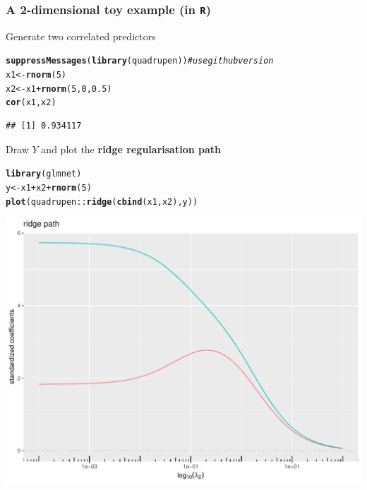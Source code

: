 \documentclass[10pt, c, xcolor=x11names]{beamer}\usepackage[]{graphicx}\usepackage[]{color}
\makeatletter
\newcommand{\hlnum}[1]{\textcolor[rgb]{0.686,0.059,0.569}{#1}}%
\newcommand{\hlcom}[1]{\textcolor[rgb]{0.678,0.584,0.686}{\textit{#1}}}%
\newcommand{\hlopt}[1]{\textcolor[rgb]{0,0,0}{#1}}%
\newcommand{\hlstd}[1]{\textcolor[rgb]{0.345,0.345,0.345}{#1}}%
\newcommand{\hlkwb}[1]{\textcolor[rgb]{0.69,0.353,0.396}{#1}}%
\newcommand{\hlkwd}[1]{\textcolor[rgb]{0.737,0.353,0.396}{\textbf{#1}}}%
\newenvironment{kframe}{%
 \def\at@end@of@kframe{}%
 \ifinner\ifhmode%
  \def\at@end@of@kframe{\end{minipage}}%
  \begin{minipage}{\columnwidth}%
 \fi\fi%
 \def\FrameCommand##1{\hskip\@totalleftmargin \hskip-\fboxsep
 \colorbox{shadecolor}{##1}\hskip-\fboxsep
     \hskip-\linewidth \hskip-\@totalleftmargin \hskip\columnwidth}%
 \MakeFramed {\advance\hsize-\width
   \@totalleftmargin\z@ \linewidth\hsize
   \@setminipage}}%
 {\par\unskip\endMakeFramed%
 \at@end@of@kframe}
\newenvironment{knitrout}{}{} %
\makeatother
\begin{document}
\begin{frame}
  \frametitle{A 2-dimensional toy example (in \texttt{R})}

Generate two correlated predictors
\begin{knitrout}\scriptsize
{}\color{fgcolor}\begin{kframe}
\begin{alltt}
\hlkwd{suppressMessages}\hlstd{(}\hlkwd{library}\hlstd{(quadrupen))} \hlcom{# use github version}
\hlstd{x1} \hlkwb{<-} \hlkwd{rnorm}\hlstd{(}\hlnum{5}\hlstd{)}
\hlstd{x2} \hlkwb{<-} \hlstd{x1} \hlopt{+} \hlkwd{rnorm}\hlstd{(}\hlnum{5}\hlstd{,}\hlnum{0}\hlstd{,} \hlnum{0.5}\hlstd{)}
\hlkwd{cor}\hlstd{(x1,x2)}
\end{alltt}
\begin{verbatim}
## [1] 0.934117
\end{verbatim}
\end{kframe}
\end{knitrout}

Draw $Y$ and plot the  \alert{\bf ridge regularisation path}
\begin{knitrout}\scriptsize
{}\color{fgcolor}\begin{kframe}
\begin{alltt}
\hlkwd{library}\hlstd{(glmnet)}
\hlstd{y} \hlkwb{<-} \hlstd{x1} \hlopt{+} \hlstd{x2} \hlopt{+}\hlkwd{rnorm}\hlstd{(}\hlnum{5}\hlstd{)}
\hlkwd{plot}\hlstd{(quadrupen}\hlopt{::}\hlkwd{ridge}\hlstd{(}\hlkwd{cbind}\hlstd{(x1,x2),y))}
\end{alltt}
\end{kframe}
\includegraphics[width=.8\textwidth]{figures/subsetunnamed-chunk-18-1} 

\end{knitrout}

\end{frame}
\end{document}
